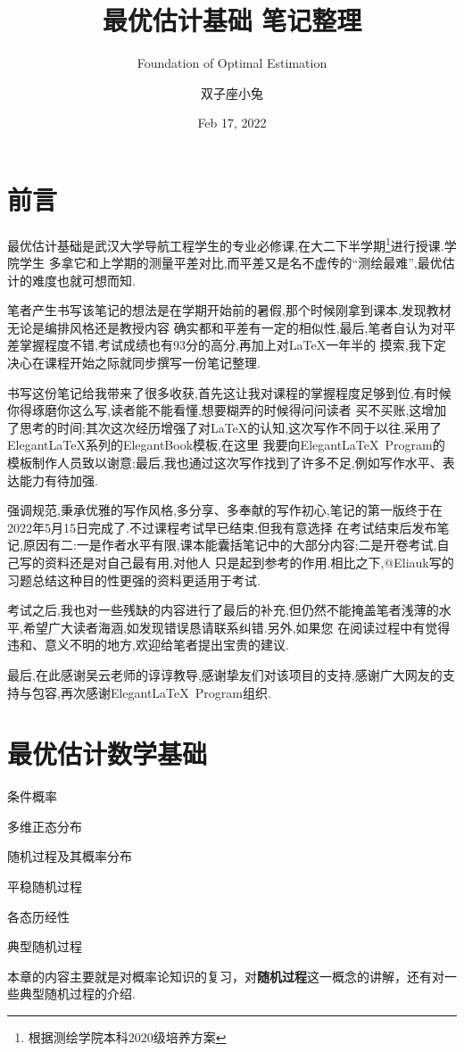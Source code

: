 \documentclass[cn,10pt,citestyle=gb7714-2015,bibstyle=gb7714-2015]{elegantbook}
\title{最优估计基础 笔记整理}
\subtitle{Foundation of Optimal Estimation}
\author{双子座小兔}
\institute{武汉大学}
\date{Feb 17, 2022}
\renewcommand{\emph}[1]{\textbf{#1}}%
\begin{document}
\maketitle
\frontmatter
\chapter*{前言}
最优估计基础是武汉大学导航工程学生的专业必修课,在大二下半学期\footnote{根据测绘学院本科2020级培养方案}进行授课.学院学生
多拿它和上学期的测量平差对比,而平差又是名不虚传的“测绘最难”,最优估计的难度也就可想而知.

笔者产生书写该笔记的想法是在学期开始前的暑假,那个时候刚拿到课本,发现教材无论是编排风格还是教授内容
确实都和平差有一定的相似性,最后,笔者自认为对平差掌握程度不错,考试成绩也有93分的高分,再加上对\LaTeX 一年半的
摸索,我下定决心在课程开始之际就同步撰写一份笔记整理.

书写这份笔记给我带来了很多收获,首先这让我对课程的掌握程度足够到位,有时候你得琢磨你这么写,读者能不能看懂,想要糊弄的时候得问问读者
买不买账,这增加了思考的时间;其次这次经历增强了对\LaTeX 的认知,这次写作不同于以往,采用了Elegant\LaTeX 系列的ElegantBook模板,在这里
我要向Elegant\LaTeX\ Program的模板制作人员致以谢意;最后,我也通过这次写作找到了许多不足,例如写作水平、表达能力有待加强.

强调规范,秉承优雅的写作风格,多分享、多奉献的写作初心,笔记的第一版终于在2022年5月15日完成了.不过课程考试早已结束,但我有意选择
在考试结束后发布笔记,原因有二:一是作者水平有限,课本能囊括笔记中的大部分内容;二是开卷考试,自己写的资料还是对自己最有用,对他人
只是起到参考的作用.相比之下,@Eliauk写的习题总结这种目的性更强的资料更适用于考试.

考试之后,我也对一些残缺的内容进行了最后的补充,但仍然不能掩盖笔者浅薄的水平,希望广大读者海涵,如发现错误恳请联系纠错.另外,如果您
在阅读过程中有觉得违和、意义不明的地方,欢迎给笔者提出宝贵的建议.

最后,在此感谢吴云老师的谆谆教导,感谢挚友们对该项目的支持,感谢广大网友的支持与包容,再次感谢Elegant\LaTeX\ Program组织.


\tableofcontents

\mainmatter

\chapter{最优估计数学基础}
\begin{introduction}
  \item 条件概率
  \item 多维正态分布
  \item 随机过程及其概率分布
  \item 平稳随机过程
  \item 各态历经性
  \item 典型随机过程
\end{introduction}
本章的内容主要就是对概率论知识的复习，对\emph{随机过程}这一概念的讲解，还有对一些典型随机过程的介绍.
\end{document}
